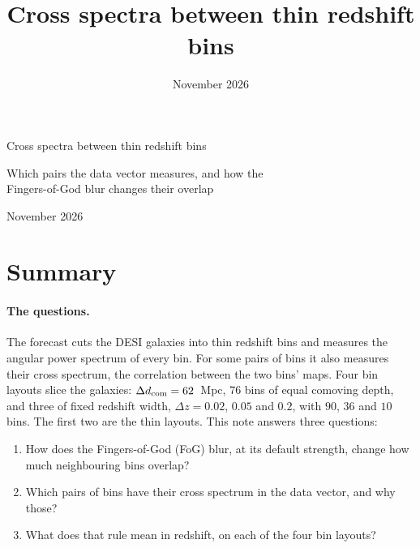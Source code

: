 \documentclass[11pt]{article}
\title{Cross spectra between thin redshift bins}
\date{November 2026}
\author{}
\newcommand{\dcom}{$\Delta d_{\rm com} = 62$~Mpc}
\begin{document}
\begin{center}
  {\LARGE Cross spectra between thin redshift bins\par}
  \vspace{0.6em}
  {\large Which pairs the data vector measures, and how the\\
    Fingers-of-God blur changes their overlap\par}
  \vspace{1em}
  {\large November 2026\par}
\end{center}
\vspace{1em}

\section{Summary}
\label{sec:summary}

\paragraph{The questions.}
The forecast cuts the DESI galaxies into thin redshift bins and
measures the angular power spectrum of every bin.  For some pairs of
bins it also measures their cross spectrum, the correlation between the
two bins' maps.  Four bin layouts slice the galaxies: \dcom{}, $76$ bins
of equal comoving depth, and three of fixed redshift width,
$\Delta z = 0.02$, $0.05$ and $0.2$, with $90$, $36$ and $10$ bins.  The
first two are the thin layouts.  This note answers three questions:
\begin{enumerate}
  \item How does the Fingers-of-God (FoG) blur, at its default
    strength, change how much neighbouring bins overlap?
  \item Which pairs of bins have their cross spectrum in the data
    vector, and why those?
  \item What does that rule mean in redshift, on each of the four bin
    layouts?
\end{enumerate}
\end{document}
